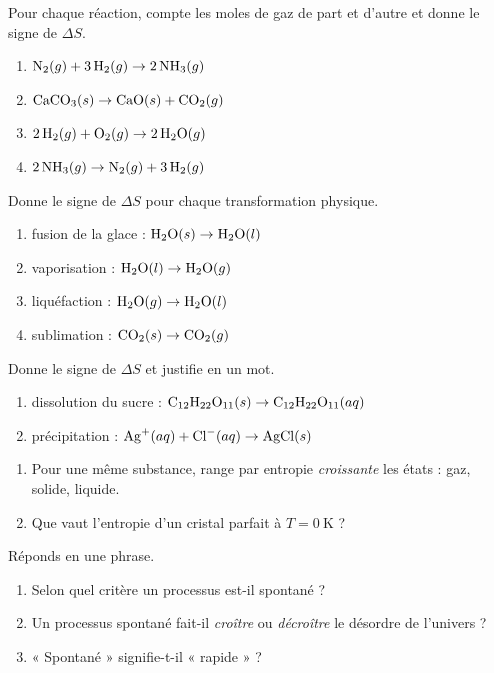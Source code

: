 \documentclass[11pt,a4paper]{article}
\begin{document}
\begin{exo}
Pour chaque réaction, compte les moles de gaz de part et d'autre et donne le signe de $\Delta S$.
\begin{enumerate}[label=\alph*)]
  \item $\ce{N2}(g) + 3\,\ce{H2}(g) \rightarrow 2\,\ce{NH3}(g)$
  \item $\ce{CaCO3}(s) \rightarrow \ce{CaO}(s) + \ce{CO2}(g)$
  \item $2\,\ce{H2}(g) + \ce{O2}(g) \rightarrow 2\,\ce{H2O}(g)$
  \item $2\,\ce{NH3}(g) \rightarrow \ce{N2}(g) + 3\,\ce{H2}(g)$
\end{enumerate}
\end{exo}

\begin{exo}
Donne le signe de $\Delta S$ pour chaque transformation physique.
\begin{enumerate}[label=\alph*)]
  \item fusion de la glace : $\ce{H2O}(s) \rightarrow \ce{H2O}(l)$
  \item vaporisation : $\ce{H2O}(l) \rightarrow \ce{H2O}(g)$
  \item liquéfaction : $\ce{H2O}(g) \rightarrow \ce{H2O}(l)$
  \item sublimation : $\ce{CO2}(s) \rightarrow \ce{CO2}(g)$
\end{enumerate}
\end{exo}

\begin{exo}
Donne le signe de $\Delta S$ et justifie en un mot.
\begin{enumerate}[label=\alph*)]
  \item dissolution du sucre : $\ce{C12H22O11}(s) \rightarrow \ce{C12H22O11}(aq)$
  \item précipitation : $\ce{Ag+}(aq) + \ce{Cl-}(aq) \rightarrow \ce{AgCl}(s)$
\end{enumerate}
\end{exo}

\begin{exo}
\begin{enumerate}[label=\alph*)]
  \item Pour une même substance, range par entropie \emph{croissante} les états : gaz, solide, liquide.
  \item Que vaut l'entropie d'un cristal parfait à $T=\qty{0}{\kelvin}$ ?
\end{enumerate}
\end{exo}

\begin{exo}
Réponds en une phrase.
\begin{enumerate}[label=\alph*)]
  \item Selon quel critère un processus est-il spontané ?
  \item Un processus spontané fait-il \emph{croître} ou \emph{décroître} le désordre de l'univers ?
  \item « Spontané » signifie-t-il « rapide » ?
\end{enumerate}
\end{exo}
\end{document}
